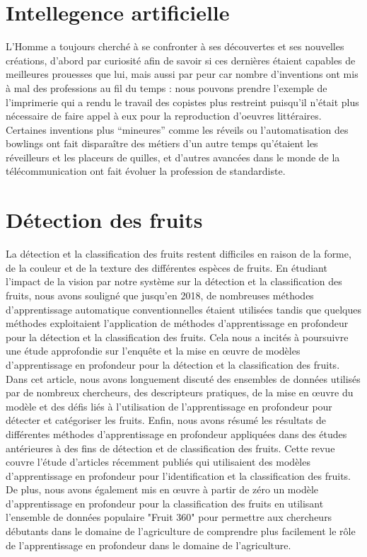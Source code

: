 \section{Intellegence artificielle}
L’Homme a toujours cherché à se confronter à ses découvertes et ses
nouvelles créations, d’abord par curiosité afin de savoir si ces dernières étaient
capables de meilleures prouesses que lui, mais aussi par peur car nombre
d’inventions ont mis à mal des professions au fil du temps : nous pouvons prendre
l’exemple de l’imprimerie qui a rendu le travail des copistes plus restreint puisqu’il
n’était plus nécessaire de faire appel à eux pour la reproduction d’oeuvres littéraires.
Certaines inventions plus “mineures” comme les réveils ou l’automatisation des
bowlings ont fait disparaître des métiers d’un autre temps qu’étaient les réveilleurs et
les placeurs de quilles, et d’autres avancées dans le monde de la télécommunication
ont fait évoluer la profession de standardiste.
\section{Détection des fruits}
La détection et la classification des fruits restent difficiles en raison de la forme, de la couleur et de la texture des différentes espèces de fruits. En étudiant l'impact de la vision par notre système sur la détection et la classification des fruits, nous avons souligné que jusqu'en 2018, de nombreuses méthodes d'apprentissage automatique conventionnelles étaient utilisées tandis que quelques méthodes exploitaient l'application de méthodes d'apprentissage en profondeur pour la détection et la classification des fruits. Cela nous a incités à poursuivre une étude approfondie sur l'enquête et la mise en œuvre de modèles d'apprentissage en profondeur pour la détection et la classification des fruits. Dans cet article, nous avons longuement discuté des ensembles de données utilisés par de nombreux chercheurs, des descripteurs pratiques, de la mise en œuvre du modèle et des défis liés à l'utilisation de l'apprentissage en profondeur pour détecter et catégoriser les fruits. Enfin, nous avons résumé les résultats de différentes méthodes d'apprentissage en profondeur appliquées dans des études antérieures à des fins de détection et de classification des fruits. Cette revue couvre l'étude d'articles récemment publiés qui utilisaient des modèles d'apprentissage en profondeur pour l'identification et la classification des fruits. De plus, nous avons également mis en œuvre à partir de zéro un modèle d'apprentissage en profondeur pour la classification des fruits en utilisant l'ensemble de données populaire "Fruit 360" pour permettre aux chercheurs débutants dans le domaine de l'agriculture de comprendre plus facilement le rôle de l'apprentissage en profondeur dans le domaine de l'agriculture.
